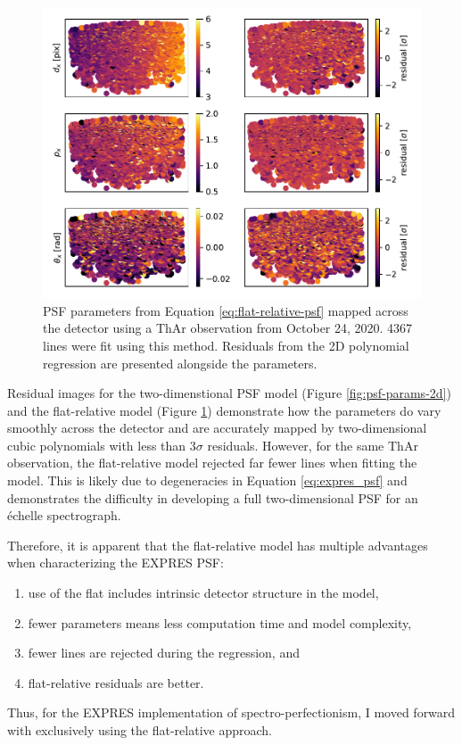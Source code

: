 \begin{figure}
    \centering
    \includegraphics[width=\textwidth]{figures-5/psf-params-1d.pdf}
    \caption{PSF parameters from Equation \ref{eq:flat-relative-psf} mapped across the detector using a ThAr observation from October 24, 2020. 4367 lines were fit using this method. Residuals from the 2D polynomial regression are presented alongside the parameters.}
    \label{fig:psf-params-1d}
\end{figure}

Residual images for the two-dimenstional PSF model (Figure \ref{fig:psf-params-2d}) and the flat-relative model (Figure \ref{fig:psf-params-1d}) demonstrate how the parameters do vary smoothly across the detector and are accurately mapped by two-dimensional cubic polynomials with less than $3\sigma$ residuals. However, for the same ThAr observation, the flat-relative model rejected far fewer lines when fitting the model. This is likely due to degeneracies in Equation \ref{eq:expres_psf} and demonstrates the difficulty in developing a full two-dimensional PSF for an \'{e}chelle spectrograph.

Therefore, it is apparent that the flat-relative model has multiple advantages when characterizing the EXPRES PSF:
\begin{enumerate}
    \item use of the flat includes intrinsic detector structure in the model,
    \item fewer parameters means less computation time and model complexity,
    \item fewer lines are rejected during the regression, and
    \item flat-relative residuals are better.
\end{enumerate}
Thus, for the EXPRES implementation of spectro-perfectionism, I moved forward with exclusively using the flat-relative approach.

